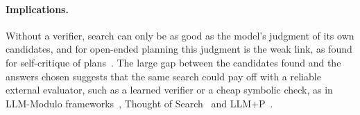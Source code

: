 \paragraph{Implications.}
Without a verifier, search can only be as good as the model's judgment of its own candidates, and for open-ended planning this judgment is the weak link, as found for self-critique of plans~\citep{valmeekam2023selfcritique,stechly2024selfverification}. The large gap between the candidates found
and the answers chosen suggests that the same search could pay off with a reliable external
evaluator, such as a learned verifier or a cheap symbolic check, as in LLM-Modulo frameworks~\citep{kambhampati2024llmmodulo}, Thought of Search~\citep{katz2024tos} and LLM+P~\citep{liu2023llmp}.
